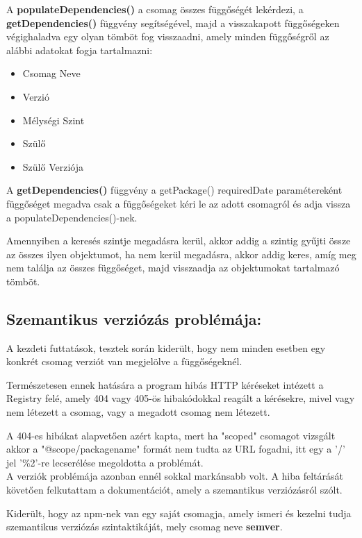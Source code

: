 \pagebreak

A \textbf{populateDependencies()} a csomag összes függőségét lekérdezi, a \textbf{getDependencies()} függvény segítségével, majd a visszakapott függőségeken végighaladva egy olyan tömböt fog visszaadni, amely minden függőségről az alábbi adatokat fogja tartalmazni:
\begin{itemize}
	\item Csomag Neve
	\item Verzió
	\item Mélységi Szint
	\item Szülő
	\item Szülő Verziója
\end{itemize}

A \textbf{getDependencies()} függvény a getPackage() requiredDate paramétereként függőséget megadva csak a függőségeket kéri le az adott csomagról és adja vissza a populateDependencies()-nek.

Amennyiben a keresés szintje megadásra kerül, akkor addig a szintig gyűjti össze az összes ilyen objektumot, ha nem kerül megadásra, akkor addig keres, amíg meg nem találja az összes függőséget, majd visszaadja az objektumokat tartalmazó tömböt.\\

\subsection{Szemantikus verziózás problémája:}

A kezdeti futtatások, tesztek során kiderült, hogy nem minden esetben egy konkrét csomag verziót van megjelölve a függőségeknél. 

Természetesen ennek hatására a program hibás HTTP kéréseket intézett a Registry felé, amely 404 vagy 405-ös hibakódokkal reagált a kérésekre, mivel vagy nem létezett a csomag, vagy a megadott csomag nem létezett. 

A 404-es hibákat alapvetően azért kapta, mert ha "scoped" csomagot vizsgált akkor a "@scope/packagename" formát nem tudta az URL fogadni, itt egy a '/' jel '\%2'-re lecserélése megoldotta a problémát.\\

A verziók problémája azonban ennél sokkal markánsabb volt. A hiba feltárását követően felkutattam a dokumentációt, amely a szemantikus verziózásról szólt. 

Kiderült, hogy az npm-nek van egy saját csomagja, amely ismeri és kezelni tudja szemantikus verziózás szintaktikáját, mely csomag neve \textbf{semver}. 

